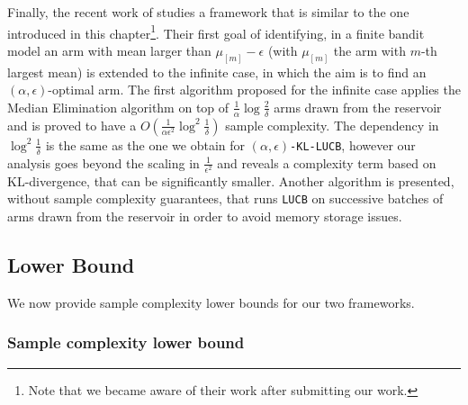 Finally, the recent work of \cite{chaudhuri2017pac} studies a framework that is similar to the one introduced in this chapter\footnote{Note that we became aware of their work after submitting our work.}. Their first goal of identifying, in a finite bandit model an arm with mean larger than $\mu_{[m]} - \epsilon$ (with $\mu_{[m]}$ the arm with $m$-th largest mean) is extended to the infinite case, in which the aim is to find an $(\alpha,\epsilon)$-optimal arm. 
The first algorithm proposed for the infinite case applies the Median Elimination algorithm \citep{EvenDaral06} on top of
$\frac{1}{\alpha}\log\frac{2}{\delta}$ 
arms drawn from the reservoir and is proved to have a
$O\left(\frac{1}{\alpha\epsilon^2} \log^2\frac{1}{\delta}\right)$
sample complexity. The dependency in $\log^2\frac{1}{\delta}$ is the same as the one we obtain for \texttt{$(\alpha,\epsilon)$-KL-LUCB}, however our analysis goes beyond the scaling in $\frac{1}{\epsilon^2}$ and reveals a complexity term based on KL-divergence, that can be significantly smaller. %
Another algorithm is presented, without sample complexity guarantees,
that runs \texttt{LUCB} on successive batches of arms drawn from the reservoir in order to avoid memory storage issues.




\subsection{Lower Bound}\label{sec-fc-lower}

We now provide sample complexity lower bounds for our two frameworks.

\subsubsection{Sample complexity lower bound}\label{sec-fc-lower-stmt}

